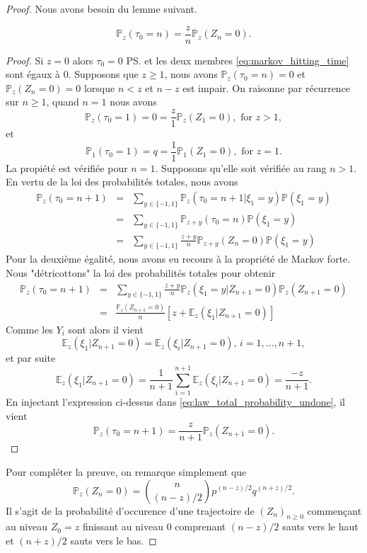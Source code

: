 \begin{proof}
Nous avons besoin du lemme suivant.
\begin{lemma}\label{lem:markov_hitting_time}
\begin{equation}\label{eq:markov_hitting_time}
\mathbb{P}_z(\tau_0 = n) = \frac{z}{n}\mathbb{P}_z(Z_n = 0).
\end{equation}
\end{lemma}
\begin{proof}
Si $z = 0$ alors $\tau_0 = 0$ \ps et les deux membres \eqref{eq:markov_hitting_time} sont égaux à $0$. Supposons que $z\geq1$, nous avons $\mathbb{P}_z(\tau_0 = n) = 0$ et $\mathbb{P}_z(Z_n = 0) = 0$ lorsque $n<z$ et $n-z$ est impair. On raisonne par récurrence sur $n\geq1$, quand $n = 1$ nous avons
$$
\mathbb{P}_z(\tau_0 = 1) = 0 = \frac{z}{1}\mathbb{P}_z(Z_1 = 0),\text{ for }z>1, 
$$
et 
$$\mathbb{P}_1(\tau_0 = 1) = q = \frac{1}{1}\mathbb{P}_1(Z_1 = 0),\text{ for }z=1. 
$$
La propiété est vérifiée pour $n=1$. Supposons qu'elle soit vérifiée au rang $n>1$. En vertu de la loi des probabilités totales, nous avons 
\begin{eqnarray*}
\mathbb{P}_z(\tau_0 = n+1)&=&\sum_{y\in\{-1,1\}}\mathbb{P}_z(\tau_0 = n+1|\xi_1 = y)\mathbb{P}(\xi_1 = y)\\
&=&\sum_{y\in\{-1,1\}}\mathbb{P}_{z+y}(\tau_0 = n)\mathbb{P}(\xi_1 = y)\\
&=&\sum_{y\in\{-1,1\}}\frac{z+y}{n}\mathbb{P}_{z+y}(Z_n = 0)\mathbb{P}(\xi_1 = y)
\end{eqnarray*}
Pour la deuxième égalité, nous avons eu recours à la propriété de Markov forte. Nous "détricottons" la loi des probabilités totales pour obtenir
\begin{eqnarray}
\mathbb{P}_z(\tau_0 = n+1)&=&\sum_{y\in\{-1,1\}}\frac{z+y}{n}\mathbb{P}_{z}(\xi_1 = y|Z_{n+1} = 0)\mathbb{P}_z(Z_{n+1} = 0)\nonumber\\
&=&\frac{\mathbb{P}_z(Z_{n+1} = 0)}{n}\left[z+\mathbb{E}_z(\xi_1|Z_{n+1}=0)\right]\label{eq:law_total_probability_undone}
\end{eqnarray}
Comme les $Y_i$ sont \iid alors il vient 
$$
\mathbb{E}_z(\xi_1|Z_{n+1}=0) = \mathbb{E}_z(\xi_i|Z_{n+1}=0)\text{, } i = 1, \ldots, n+1,
$$
et par suite 
$$
\mathbb{E}_z(\xi_1|Z_{n+1}=0) = \frac{1}{n+1}\sum_{i =1}^{n+1}\mathbb{E}_z(\xi_i|Z_{n+1}=0) = \frac{-z}{n+1}.
$$
En injectant l'expression ci-dessus dans \eqref{eq:law_total_probability_undone}, il vient 
$$
\mathbb{P}_z(\tau_0 = n+1) = \frac{z}{n+1}\mathbb{P}_z(Z_{n+1} = 0).
$$
\end{proof}
Pour compléter la preuve, on remarque simplement que
$$
\mathbb{P}_z(Z_n = 0) = \binom{n}{(n-z) / 2}p^{(n-z) / 2}q^{(n
+z) / 2}.
$$
Il s'agit de la probabilité d'occurence d'une trajectoire de $(Z_n)_{n \geq0}$ commençant au niveau $Z_0 = z$ finissant au niveau $0$ comprenant $(n-z)/2$ sauts vers le haut et $(n+z)/2$ sauts vers le bas.
\end{proof}
